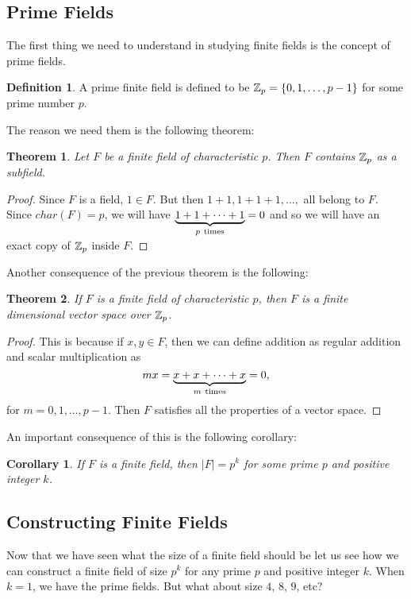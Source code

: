 \documentclass[12pt]{article}
\theoremstyle{plain}
\newtheorem{corollary}{Corollary}
\newtheorem{theorem}{Theorem}
\theoremstyle{definition}
\newtheorem{definition}{Definition}
\theoremstyle{remark}
\begin{document}
\subsection{Prime Fields}
The first thing we need to understand in studying finite fields is the concept of prime fields.
\begin{definition}
A prime finite field is defined to be $\mathbb{Z}_p=\{0,1, \dots, p-1\}$ for some prime number $p$.
\end{definition}
The reason we need them is the following theorem:
\begin{theorem}
Let $F$ be a finite field of characteristic $p$. Then $F$ contains $\mathbb{Z}_p$ as a subfield.
\end{theorem}
\begin{proof}
Since $F$ is a field, $1\in F$. But then $1+1, 1+1+1, \dots, $
all belong to $F$. Since $char(F)=p$, we will have $\underbrace{1 + 1+\cdots + 1}_{p\rm\ times}=0$ and so we will have an exact copy of $\mathbb{Z}_p$ inside $F$.
\end{proof}

Another consequence of the previous theorem is the following:
\begin{theorem}
If $F$ is a finite field of characteristic $p$, then $F$ is a finite dimensional vector space over $\mathbb{Z}_p$.
\end{theorem}
\begin{proof}
This is because if $x,y \in F$, then we can define addition as regular addition and scalar multiplication as
$$mx = \underbrace{x + x+\cdots + x}_{m\rm\ times}=0,$$
for $m=0,1, \dots, p-1$. Then $F$ satisfies all the properties of a vector space.
\end{proof}
An important consequence of this is the following corollary:
\begin{corollary}
If $F$ is a finite field, then $|F| = p^k$ for some prime $p$ and positive integer $k$.
\end{corollary}

\subsection{Constructing Finite Fields}
Now that we have seen what the size of a finite field should be let us see how we can construct a finite field of size $p^k$ for any prime $p$ and positive integer $k$. When $k=1$, we have the prime fields. But what about size $4$, $8$, $9$, etc?
\end{document}
